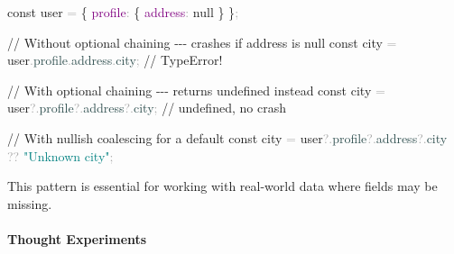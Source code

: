 \documentclass[
  justified,
  openright,
]{tufte-book}
\let\paragraph\paragraph
\newcommand{\AttributeTok}[1]{\textcolor{DarkSlateGray}{#1}}
\newcommand{\CommentTok}[1]{\textcolor{MidGray}{#1}}
\newcommand{\DataTypeTok}[1]{\textcolor{Purple}{#1}}
\newcommand{\KeywordTok}[1]{\textcolor{BrandBlue}{#1}}
\newcommand{\NormalTok}[1]{#1}
\newcommand{\OperatorTok}[1]{\textcolor{DarkGray}{#1}}
\newcommand{\StringTok}[1]{\textcolor{Teal}{#1}}
\newenvironment{Shaded}{%
  \begin{snugshade}
}{%
  \end{snugshade}
}
\let\paragraph\paragraph
\begin{document}
\begin{Shaded}
\begin{Highlighting}[]
\KeywordTok{const}\NormalTok{ user }\OperatorTok{=}\NormalTok{ \{ }\DataTypeTok{profile}\OperatorTok{:}\NormalTok{ \{ }\DataTypeTok{address}\OperatorTok{:} \KeywordTok{null}\NormalTok{ \} \}}\OperatorTok{;}

\CommentTok{// Without optional chaining {-}{-}{-} crashes if address is null}
\KeywordTok{const}\NormalTok{ city }\OperatorTok{=}\NormalTok{ user}\OperatorTok{.}\AttributeTok{profile}\OperatorTok{.}\AttributeTok{address}\OperatorTok{.}\AttributeTok{city}\OperatorTok{;} \CommentTok{// TypeError!}

\CommentTok{// With optional chaining {-}{-}{-} returns undefined instead}
\KeywordTok{const}\NormalTok{ city }\OperatorTok{=}\NormalTok{ user}\OperatorTok{?.}\AttributeTok{profile}\OperatorTok{?.}\AttributeTok{address}\OperatorTok{?.}\AttributeTok{city}\OperatorTok{;} \CommentTok{// undefined, no crash}

\CommentTok{// With nullish coalescing for a default}
\KeywordTok{const}\NormalTok{ city }\OperatorTok{=}\NormalTok{ user}\OperatorTok{?.}\AttributeTok{profile}\OperatorTok{?.}\AttributeTok{address}\OperatorTok{?.}\AttributeTok{city} \OperatorTok{??} \StringTok{"Unknown city"}\OperatorTok{;}
\end{Highlighting}
\end{Shaded}

This pattern is essential for working with real-world data where fields
may be missing.

\paragraph{Thought Experiments}\label{thought-experiments-5}
\end{document}
